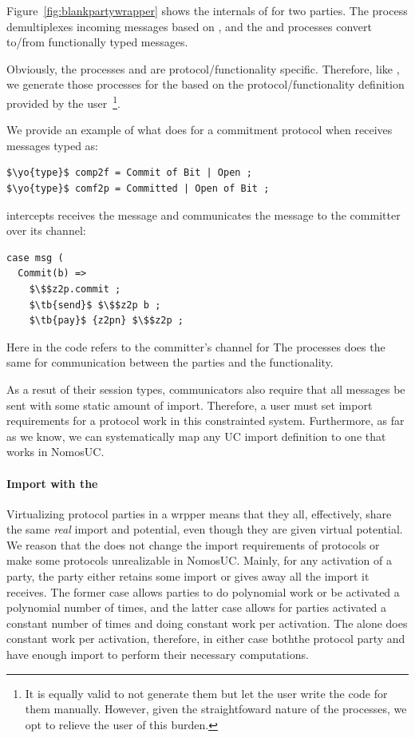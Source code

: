 Figure~\ref{fig:blankpartywrapper} shows the internals of \pw for two parties. The process  demultiplexes incoming messages based on , and the  and  processes convert to/from functionally typed messages. 

Obviously, the processes  and  are protocol/functionality specific.
Therefore, like \iexecuc, we generate those processes for the \partywrapper based on the protocol/functionality definition provided by the user~\footnote{It is equally valid to not generate them but let the user write the code for them manually. However, given the straightfoward nature of the processes, we opt to relieve the user of this burden.}.

We provide an example of what  does for a commitment protocol when \pw receives messages typed as:
\begin{lstlisting}[basicstyle=\footnotesize\BeraMonottFamily, mathescape]
$\yo{type}$ comp2f = Commit of Bit | Open ;
$\yo{type}$ comf2p = Committed | Open of Bit ;
\end{lstlisting}
 intercepts receives the message and communicates the message to the committer over its channel:
\begin{lstlisting}[basicstyle=\footnotesize\BeraMonottFamily, frame=single, mathescape]
case msg (
  Commit(b) =>
    $\$$z2p.commit ;
    $\tb{send}$ $\$$z2p b ;
    $\tb{pay}$ {z2pn} $\$$z2p ;
\end{lstlisting}
Here  in the code refers to the committer's channel for \Z
The  processes does the same for communication between the parties and the functionality.

As a resut of their session types, communicators also require that all messages be sent with some static amount of import.
Therefore, a user must set import requirements for a protocol work in this constrainted system.
Furthermore, as far as we know, we can systematically map any UC import definition to one that works in NomosUC.

\paragraph{Import with the \partywrapper}
Virtualizing protocol parties in a wrpper means that they all, effectively, share the same \emph{real} import and potential, even though they are given virtual potential.
We reason that the \partywrapper does not change the import requirements of protocols or make some protocols unrealizable in NomosUC.
Mainly, for any activation of a party, the party either retains some import or gives away all the import it receives. 
The former case allows parties to do polynomial work or be activated a polynomial number of times, and the latter case allows for parties activated a constant number of times and doing constant work per activation.
The \pw alone does constant work per activation, therefore, in either case boththe protocol party and \pw have enough import to perform their necessary computations.

